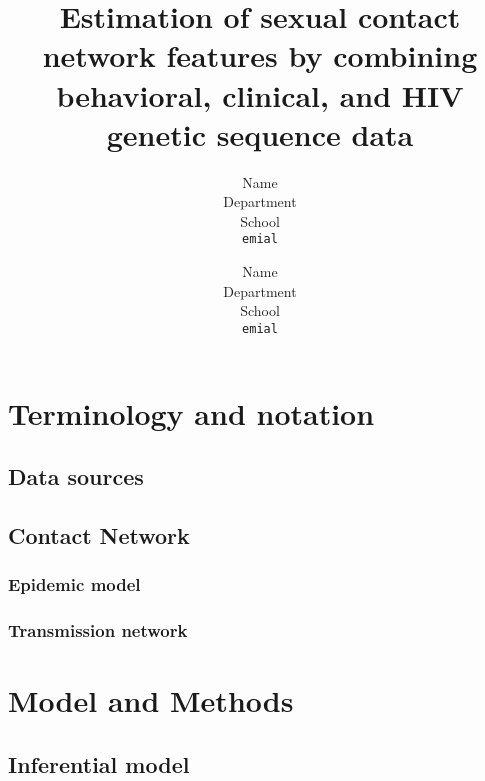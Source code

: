 \documentclass{article}
\title{Estimation of sexual contact network features by combining behavioral, clinical, and HIV genetic sequence data}
\author{
  Name \\
  Department\\
  School\\
  \texttt{emial} \\
  \and
  Name \\
  Department\\
  School\\
  \texttt{emial} \\
}
\begin{document}
\maketitle

\begin{abstract}

\end{abstract}


\section{Terminology and notation}

    \subsection{Data sources}

    \subsection{Contact Network}

        

    \subsubsection{Epidemic model}

        

    \subsubsection{Transmission network}

        

\section{Model and Methods}
\label{sec:model}

    

    \subsection{Inferential model}
\end{document}
